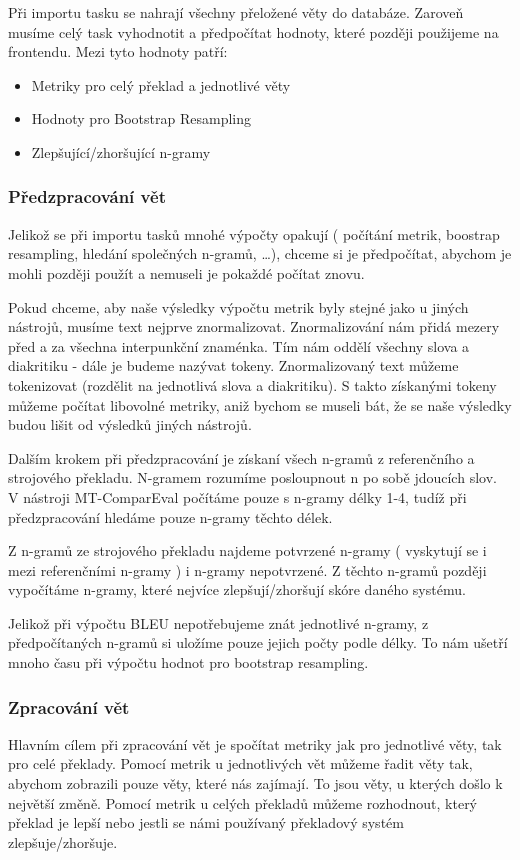 Při importu tasku se nahrají všechny přeložené věty do databáze.
Zaroveň musíme celý task vyhodnotit a předpočítat hodnoty,
  které později použijeme na frontendu.
Mezi tyto hodnoty patří:
\begin{itemize}
	\item Metriky pro celý překlad a jednotlivé věty
	\item Hodnoty pro Bootstrap Resampling 
	\item Zlepšující/zhoršující n-gramy
\end{itemize}

\subsubsection{Předzpracování vět}
Jelikož se při importu tasků mnohé výpočty opakují
  ( počítání metrik, boostrap resampling, hledání společných n-gramů, \dots ),
  chceme si je předpočítat,
  abychom je mohli později použít a nemuseli je pokaždé počítat znovu.

Pokud chceme,
  aby naše výsledky výpočtu metrik byly stejné jako u jiných nástrojů,
  musíme text nejprve znormalizovat.
Znormalizování nám přidá mezery před a za všechna interpunkční znaménka.
Tím nám oddělí všechny slova a diakritiku - dále je budeme nazývat tokeny.
Znormalizovaný text můžeme tokenizovat (rozdělit na jednotlivá slova a diakritiku).
S takto získanými tokeny můžeme počítat libovolné metriky,
  aniž bychom se museli bát,
  že se naše výsledky budou lišit od výsledků jiných nástrojů.

Dalším krokem při předzpracování je získaní všech n-gramů z referenčního a strojového překladu.
N-gramem rozumíme posloupnout n po sobě jdoucích slov.
V nástroji MT-ComparEval počítáme pouze s n-gramy délky 1-4,
  tudíž při předzpracování hledáme pouze n-gramy těchto délek. 

Z n-gramů ze strojového překladu najdeme potvrzené n-gramy
  ( vyskytují se i mezi referenčními n-gramy )
  i n-gramy nepotvrzené.
Z těchto n-gramů později vypočítáme n-gramy,
  které nejvíce zlepšují/zhoršují skóre daného systému.
  
Jelikož při výpočtu BLEU nepotřebujeme znát jednotlivé n-gramy,
  z předpočítaných n-gramů si uložíme pouze jejich počty podle délky.
To nám ušetří mnoho času při výpočtu hodnot pro bootstrap resampling.

\subsubsection{Zpracování vět}
Hlavním cílem při zpracování vět je spočítat metriky jak pro jednotlivé věty,
  tak pro celé překlady.
Pomocí metrik u jednotlivých vět můžeme řadit věty tak,
  abychom zobrazili pouze věty, 
  které nás zajímají.
To jsou věty, u kterých došlo k největší změně.
Pomocí metrik u celých překladů můžeme rozhodnout,
  který překlad je lepší
  nebo jestli se námi používaný překladový systém zlepšuje/zhoršuje.

